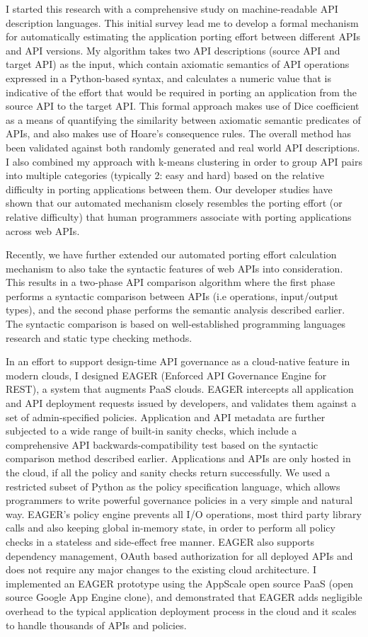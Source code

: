 I started this research with a comprehensive study on machine-readable API description languages. This initial survey lead me to develop a formal mechanism for automatically estimating the application porting effort between different APIs and API versions. My algorithm takes two API descriptions (source API and target API) as the input, which contain axiomatic semantics of API operations expressed in a Python-based syntax, and calculates a numeric value that is indicative of the effort that would be required in porting an application from the source API to the target API. This formal approach makes use of Dice coefficient as a means of quantifying the similarity between axiomatic semantic predicates of APIs, and also makes use of Hoare's consequence rules. The overall method has been validated against both randomly generated and real world API descriptions. I also combined my approach with k-means clustering in order to group API pairs into multiple categories (typically 2: easy and hard) based on the relative difficulty in porting applications between them. Our developer studies have shown that our automated mechanism closely resembles the porting effort (or relative difficulty) that human programmers associate with porting applications across web APIs.

Recently, we have further extended our automated porting effort calculation mechanism to also take the syntactic features of web APIs into consideration. This results in a two-phase API comparison algorithm where the first phase performs a syntactic comparison between APIs (i.e operations, input/output types), and the second phase performs the semantic analysis described earlier. The syntactic comparison is based on well-established programming languages research and static type checking methods.

In an effort to support design-time API governance as a cloud-native feature in modern clouds, I designed EAGER (Enforced API Governance Engine for REST), a system that augments PaaS clouds. EAGER intercepts all application and API deployment requests issued by developers, and validates them against a set of admin-specified policies. Application and API metadata are further subjected to a wide range of built-in sanity checks, which include a comprehensive API backwards-compatibility test based on the syntactic comparison method described earlier. Applications and APIs are only hosted in the cloud, if all the policy and sanity checks return successfully. We used a restricted subset of Python as the policy specification language, which allows programmers to write powerful governance policies in a very simple and natural way. EAGER's policy engine prevents all I/O operations, most third party library calls and also keeping global in-memory state, in order to perform all policy checks in a stateless and side-effect free manner. EAGER also supports dependency management, OAuth based authorization for all deployed APIs and does not require any major changes to the existing cloud architecture. I implemented an EAGER prototype using the AppScale open source PaaS (open source Google App Engine clone), and demonstrated that EAGER adds negligible overhead to the typical application deployment process in the cloud and it scales to handle thousands of APIs and policies.